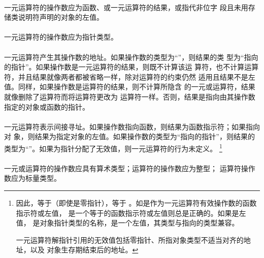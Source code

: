 
\constraint
\paragraph{}
一元运算符\tm{\&}的操作数应为函数、\tm{[]}或一元\tm{*}运算符的结果，或指代非位字
段且未用存储类说明符声明的对象的左值。

\paragraph{}
一元\tm{*}运算符的操作数应为指针类型。

\semantic
\paragraph{}
一元运算符\tm{\&}产生其操作数的地址。如果操作数的类型为``''，则结果的类
型为``指向的指针''。如果操作数是一元\tm{*}运算符的结果，则既不计算该运
算符，也不计算\tm{\&}运算符，并且结果就像两者都被省略一样，除对运算符的约束仍然
适用且结果不是左值。同样，如果操作数是\tm{[]}运算符的结果，则不计算\tm{[]}所隐含
的一元\tm{\&}或\tm{*}运算符，结果就像删除了\tm{\&}运算符而将\tm{[]}运算符更改为
\tm{+}运算符一样。否则，结果是指向由其操作数指定的对象或函数的指针。

\paragraph{}
一元\tm{*}运算符表示间接寻址。如果操作数指向函数，则结果为函数指示符；如果指向对
象，则结果为指定对象的左值。如果操作数的类型为``指向的指针''，则结果的
类型为``''。如果为指针分配了无效值，则一元\tm{*}运算符的行为未定义。
\footnote{因此，等于（即使是零指针），等于
。如是作为一元\tm{\&}运算符有效操作数的函数指示符或左值，
是一个等于的函数指示符或左值则总是正确的。如果是左值，
是对象指针类型的名称，是一个左值，其类型与指向的类型兼容。

一元\tm{*}运算符解指针引用的无效值包括零指针、所指对象类型不适当对齐的地址，以及
对象生存期结束后的地址。}


\constraint
\paragraph{}
一元\tm{+}或\tm{-}运算符的操作数应具有算术类型；\tm{\~}运算符的操作数应为整型；
\tm{!}运算符操作数应为标量类型。

